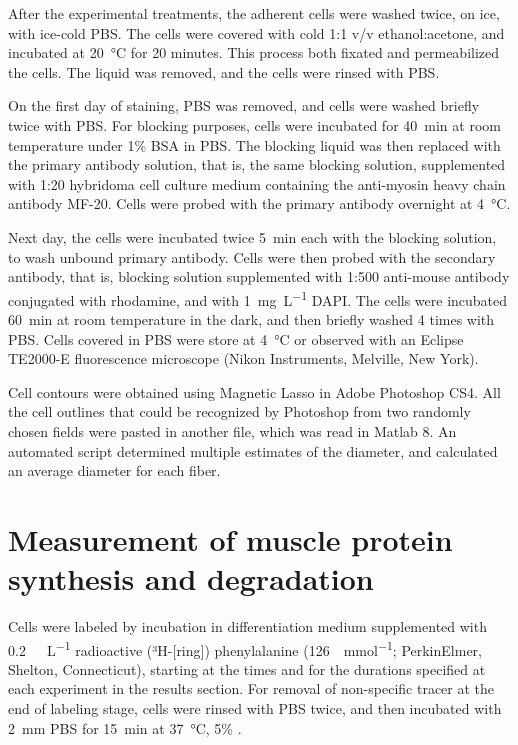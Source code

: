 \documentclass[12pt,english]{report}\usepackage[]{graphicx}\usepackage[]{color}
\begin{document}
After the experimental treatments, the adherent cells were washed
twice, on ice, with ice-cold PBS. The cells were covered with cold
1:1 v/v ethanol:acetone, and incubated at \SI{20}{\celsius} for 20
minutes. This process both fixated and permeabilized the cells. The
liquid was removed, and the cells were rinsed with PBS.

On the first day of staining, PBS was removed, and cells were washed
briefly twice with PBS. For blocking purposes, cells were incubated
for \SI{40}{\minute} at room temperature under 1\% BSA in PBS. The
blocking liquid was then replaced with the primary antibody solution,
that is, the same blocking solution, supplemented with 1:20 hybridoma
cell culture medium containing the anti-myosin heavy chain antibody
MF-20. Cells were probed with the primary antibody overnight at \SI{4}{\celsius}.

Next day, the cells were incubated twice \SI{5}{\minute} each with
the blocking solution, to wash unbound primary antibody. Cells were
then probed with the secondary antibody, that is, blocking solution
supplemented with 1:500 anti-mouse antibody conjugated with rhodamine,
and with \SI{1}{\milli\gram\per\liter} DAPI. The cells were incubated
\SI{60}{\minute} at room temperature in the dark, and then briefly
washed 4 times with PBS. Cells covered in PBS were store at \SI{4}{\celsius}
or observed with an Eclipse TE2000-E fluorescence microscope (Nikon
Instruments, Melville, New York).

Cell contours were obtained using Magnetic Lasso in Adobe Photoshop
CS4. All the cell outlines that could be recognized by Photoshop from
two randomly chosen fields were pasted in another file, which was
read in Matlab 8. An automated script determined multiple estimates
of the diameter, and calculated an average diameter for each fiber.


\section{Measurement of muscle protein synthesis and degradation}

Cells were labeled by incubation in differentiation medium supplemented
with \SI{0.2}{\milli\curie\per\liter} radioactive (³H-{[}ring{]})
phenylalanine (\SI{126}{\curie\per\milli\mole}; PerkinElmer, Shelton,
Connecticut), starting at the times and for the durations specified
at each experiment in the results section. For removal of non-specific
tracer at the end of labeling stage, cells were rinsed with PBS twice,
and then incubated with \SI{2}{\milli\meter} PBS for \SI{15}{\minute}
at \SI{37}{\celsius}, 5\% .
\end{document}
